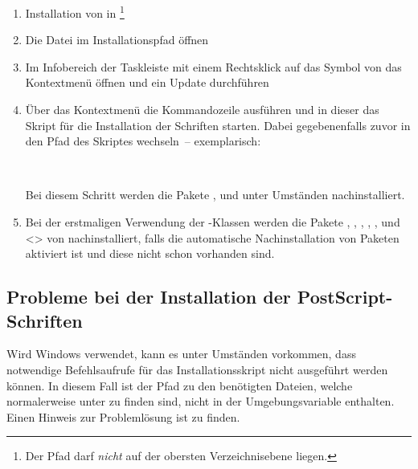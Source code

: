 \begin{enumerate}
\item Installation von  in 
  \footnote{Der Pfad darf \emph{nicht} auf der obersten Verzeichnisebene 
   liegen.
  }
\item Die Datei  im Installationspfad öffnen
\item Im Infobereich der Taskleiste mit einem Rechtsklick auf das Symbol von 
   das Kontextmenü öffnen und ein Update 
  durchführen
\item Über das Kontextmenü die Kommandozeile ausführen und in dieser das Skript 
  für die Installation der Schriften  starten.
  Dabei gegebenenfalls zuvor in den Pfad des Skriptes wechseln~-- exemplarisch:
  \begin{quoting}[leftmargin=1.5em,rightmargin=0pt]
  \newline
  \,
  \end{quoting}
  Bei diesem Schritt werden die Pakete ,  
  und  unter Umständen nachinstalliert.
\item Bei der erstmaligen Verwendung der \TUDScript-Klassen werden die 
  Pakete , , ,
  , ,  und
  <> von 
  nachinstalliert, falls die automatische Nachinstallation von Paketen 
  aktiviert ist und diese nicht schon vorhanden sind.
\end{enumerate}


\subsection{Probleme bei der Installation der PostScript-Schriften}
%
Wird Windows verwendet, kann es unter Umständen vorkommen, dass notwendige 
Befehlsaufrufe für das Installationsskript nicht ausgeführt werden können. In 
diesem Fall ist der Pfad zu den benötigten Dateien, welche normalerweise unter 
 zu finden sind, nicht in der 
Umgebungsvariable  enthalten. Einen Hinweis zur Problemlösung ist 
zu finden.

